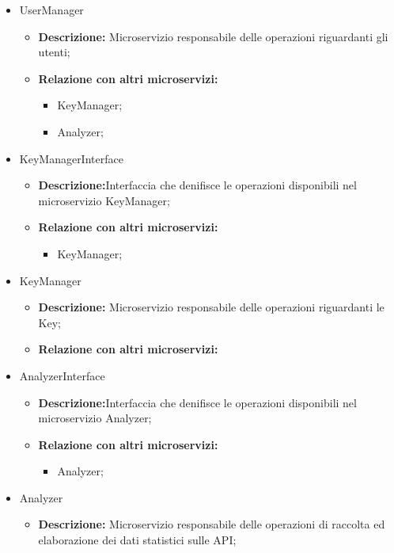 {\begin{itemize}
\begin{itemize}
\begin{itemize}
      \item UserManager;
      \end{itemize}
  \end{itemize}
\item UserManager
  \begin{itemize}
  \item \textbf{Descrizione:} Microservizio responsabile delle operazioni riguardanti gli utenti;
    \item \textbf{Relazione con altri microservizi:}
      \begin{itemize}
        \item KeyManager;
        \item Analyzer;
      \end{itemize}
  \end{itemize}
\item KeyManagerInterface
  \begin{itemize}
  \item \textbf{Descrizione:}Interfaccia che denifisce le operazioni disponibili nel microservizio KeyManager;
    \item \textbf{Relazione con altri microservizi:}
      \begin{itemize}
      \item KeyManager;
      \end{itemize}
  \end{itemize}
\item KeyManager
  \begin{itemize}
  \item \textbf{Descrizione:} Microservizio responsabile delle operazioni riguardanti le Key;
    \item \textbf{Relazione con altri microservizi:}
  \end{itemize}
\item AnalyzerInterface
  \begin{itemize}
  \item \textbf{Descrizione:}Interfaccia che denifisce le operazioni disponibili nel microservizio Analyzer;
    \item \textbf{Relazione con altri microservizi:}
      \begin{itemize}
      \item Analyzer;
      \end{itemize}
  \end{itemize}
\item Analyzer
  \begin{itemize}
  \item \textbf{Descrizione:} Microservizio responsabile delle operazioni di raccolta ed elaborazione dei dati statistici sulle API;

\end{itemize}
\end{itemize}}
